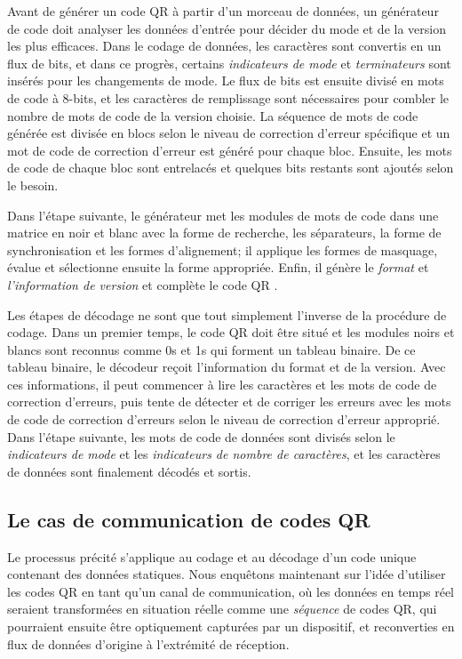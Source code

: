 Avant de générer un code QR à partir d'un morceau de données, un générateur de code doit analyser les données d'entrée pour décider du mode et de la version les plus efficaces. Dans le codage de données, les caractères sont convertis en un flux de bits, et dans ce progrès, certains \emph{indicateurs de mode} et \emph{terminateurs} sont insérés pour les changements de mode. Le flux de bits est ensuite divisé en mots de code à 8-bits, et les caractères de remplissage sont nécessaires pour combler le nombre de mots de code de la version choisie. La séquence de mots de code générée est divisée en blocs selon le niveau de correction d'erreur spécifique et un mot de code de correction d'erreur est généré pour chaque bloc. Ensuite, les mots de code de chaque bloc sont entrelacés et quelques bits restants sont ajoutés selon le besoin.

Dans l'étape suivante, le générateur met les modules de mots de code dans une matrice en noir et blanc avec la forme de recherche, les séparateurs, la forme de synchronisation et les formes d'alignement; il applique les formes de masquage, évalue et sélectionne ensuite la forme appropriée. Enfin, il génère le \emph{format} et \emph{l'information de version} et complète le code QR \citep{iso18004}.

Les étapes de décodage ne sont que tout simplement l'inverse de la procédure de codage. Dans un premier temps, le code QR doit être situé et les modules noirs et blancs sont reconnus comme 0s et 1s qui forment un tableau binaire. De ce tableau binaire, le décodeur reçoit l'information du format et de la version. Avec ces informations, il peut commencer à lire les caractères et les mots de code de correction d'erreurs, puis tente de détecter et de corriger les erreurs avec les mots de code de correction d'erreurs selon le niveau de correction d'erreur approprié. Dans l'étape suivante, les mots de code de données sont divisés selon le \emph{indicateurs de mode} et les \emph{indicateurs de nombre de caractères}, et les caractères de données sont finalement décodés et sortis.

\subsection{Le cas de communication de codes QR}

Le processus précité s'applique au codage et au décodage d'un code unique contenant des données statiques. Nous enquêtons maintenant sur l'idée d'utiliser les codes QR en tant qu'un canal de communication, où les données en temps réel seraient transformées en situation réelle comme une \emph{séquence} de codes QR, qui pourraient ensuite être optiquement capturées par un dispositif, et reconverties en flux de données d'origine à l'extrémité de réception.

